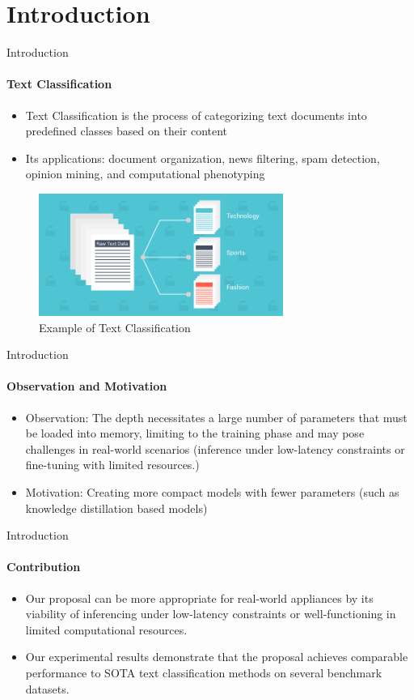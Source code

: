 \section{Introduction}
\begin{frame}{Introduction}
\framesubtitle{Text Classification}
\begin{itemize}
\item Text Classification is the process of categorizing text documents into predefined classes based on their content
\item Its applications: document organization, news filtering, spam detection, opinion mining, and computational phenotyping
\end{itemize}

\begin{figure}
\centering
\includegraphics[width=80mm,scale=0.7]{img/TC_example.png}
\caption{Example of Text Classification}
\label{fig:example}
\end{figure}
\end{frame}

\begin{frame}{Introduction}
    \framesubtitle{Observation and Motivation}
\begin{itemize}
    \item Observation: The depth necessitates a large number of parameters that must be loaded into memory, limiting to the training phase and may pose challenges in real-world scenarios (inference under low-latency constraints or fine-tuning with limited resources.)
    \item Motivation: Creating more compact models with fewer parameters (such as knowledge distillation based models)
\end{itemize}
\end{frame}

\begin{frame}{Introduction}
\framesubtitle{Contribution}
\begin{itemize}
\item Our proposal can be more appropriate for real-world appliances by its viability of inferencing under low-latency constraints or well-functioning in limited computational resources.
\item Our experimental results demonstrate that the proposal achieves comparable performance to SOTA text classification methods on several benchmark datasets.
\end{itemize}
    
\end{frame}
